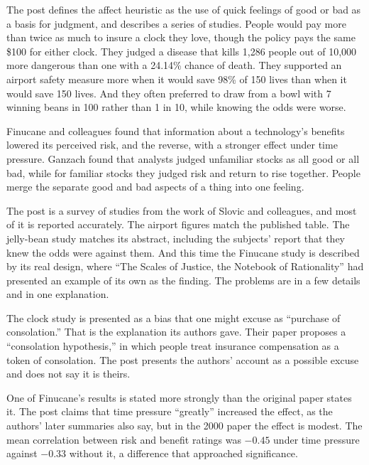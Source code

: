 \begin{afterword}
\summaryhead

The post defines the affect heuristic as the use of quick feelings of good or bad as a basis for judgment, and describes a series of studies. People would pay more than twice as much to insure a clock they love, though the policy pays the same \$100 for either clock. They judged a disease that kills 1,286 people out of 10,000 more dangerous than one with a 24.14\% chance of death. They supported an airport safety measure more when it would save 98\% of 150 lives than when it would save 150 lives. And they often preferred to draw from a bowl with 7 winning beans in 100 rather than 1 in 10, while knowing the odds were worse.

Finucane and colleagues found that information about a technology's benefits lowered its perceived risk, and the reverse, with a stronger effect under time pressure. Ganzach found that analysts judged unfamiliar stocks as all good or all bad, while for familiar stocks they judged risk and return to rise together. People merge the separate good and bad aspects of a thing into one feeling.

\responsehead

The post is a survey of studies from the work of Slovic and colleagues, and most of it is reported accurately. The airport figures match the published table. The jelly-bean study matches its abstract, including the subjects' report that they knew the odds were against them. And this time the Finucane study is described by its real design, where ``The Scales of Justice, the Notebook of Rationality'' had presented an example of its own as the finding. The problems are in a few details and in one explanation.

The clock study is presented as a bias that one might excuse as ``purchase of consolation.'' That is the explanation its authors gave. Their paper proposes a ``consolation hypothesis,'' in which people treat insurance compensation as a token of consolation. The post presents the authors' account as a possible excuse and does not say it is theirs.

One of Finucane's results is stated more strongly than the original paper states it. The post claims that time pressure ``greatly'' increased the effect, as the authors' later summaries also say, but in the 2000 paper the effect is modest. The mean correlation between risk and benefit ratings was $-0.45$ under time pressure against $-0.33$ without it, a difference that approached significance.


\end{afterword}
